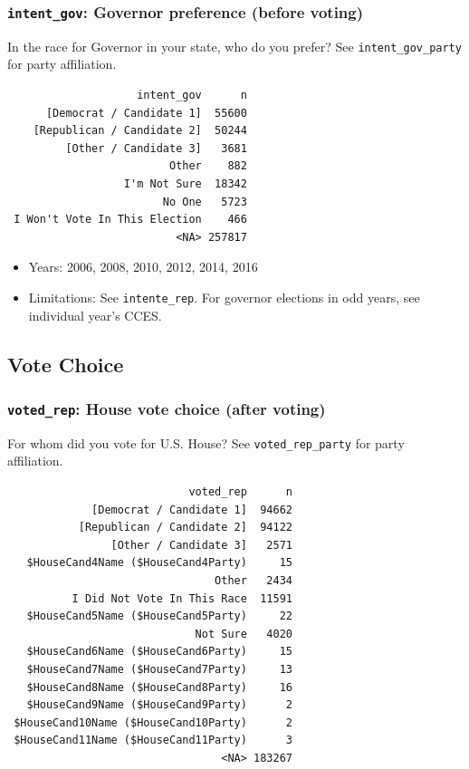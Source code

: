 \documentclass[10pt,article,oneside]{memoir}
\theoremstyle{definition}
\begin{document}
\hypertarget{intent_gov-governor-preference-before-voting}{%
\subsubsection{\texorpdfstring{\texttt{intent\_gov}: Governor preference
(before
voting)}{intent\_gov: Governor preference (before voting)}}\label{intent_gov-governor-preference-before-voting}}

In the race for Governor in your state, who do you prefer? See
\texttt{intent\_gov\_party} for party affiliation.

\begin{verbatim}
                    intent_gov      n
      [Democrat / Candidate 1]  55600
    [Republican / Candidate 2]  50244
         [Other / Candidate 3]   3681
                         Other    882
                  I'm Not Sure  18342
                        No One   5723
 I Won't Vote In This Election    466
                          <NA> 257817
\end{verbatim}

\begin{itemize}
\tightlist
\item
  Years: 2006, 2008, 2010, 2012, 2014, 2016
\item
  Limitations: See \texttt{intente\_rep}. For governor elections in odd
  years, see individual year's CCES.
\end{itemize}

\hypertarget{vote-choice}{%
\subsection{Vote Choice}\label{vote-choice}}

\hypertarget{voted_rep-house-vote-choice-after-voting}{%
\subsubsection{\texorpdfstring{\texttt{voted\_rep}: House vote choice
(after
voting)}{voted\_rep: House vote choice (after voting)}}\label{voted_rep-house-vote-choice-after-voting}}

For whom did you vote for U.S. House? See \texttt{voted\_rep\_party} for
party affiliation.

\begin{verbatim}
                            voted_rep      n
             [Democrat / Candidate 1]  94662
           [Republican / Candidate 2]  94122
                [Other / Candidate 3]   2571
   $HouseCand4Name ($HouseCand4Party)     15
                                Other   2434
          I Did Not Vote In This Race  11591
   $HouseCand5Name ($HouseCand5Party)     22
                             Not Sure   4020
   $HouseCand6Name ($HouseCand6Party)     15
   $HouseCand7Name ($HouseCand7Party)     13
   $HouseCand8Name ($HouseCand8Party)     16
   $HouseCand9Name ($HouseCand9Party)      2
 $HouseCand10Name ($HouseCand10Party)      2
 $HouseCand11Name ($HouseCand11Party)      3
                                 <NA> 183267
\end{verbatim}
\end{document}

